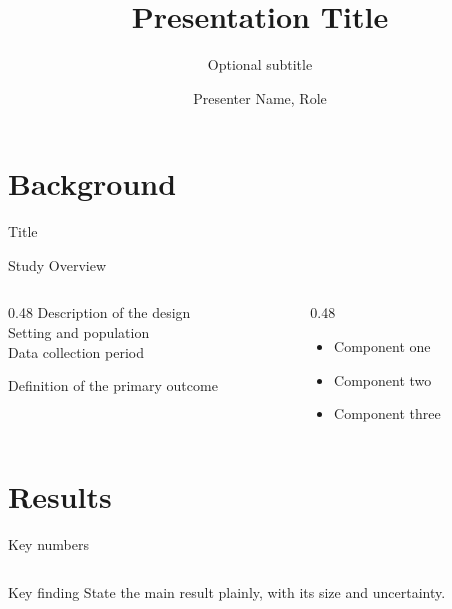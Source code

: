 \documentclass[aspectratio=169, 11pt]{beamer}
\title{Presentation Title}
\subtitle{Optional subtitle}
\author{Presenter Name, Role}
\institute{Neudata Consulting Ltd}
\date{\neudatatoday}   %
\begin{document}
\neudatatitleframe

\section{Background}

\begin{frame}{Title}
\end{frame}

\begin{frame}{Study Overview}
  \begin{columns}[T]
    \begin{column}{0.48\textwidth}
      Description of the design \\
      Setting and population \\
      Data collection period

      Definition of the primary outcome
    \end{column}
    \begin{column}{0.48\textwidth}
      \begin{itemize}
        \item Component one
        \item Component two
        \item Component three
      \end{itemize}
    \end{column}
  \end{columns}
\end{frame}

\section{Results}

\begin{frame}{Key numbers}
  \vspace{0.6cm}
  \begin{columns}[T]
  \end{columns}
  \vspace{0.9cm}
  \begin{block}{Key finding}
    State the main result plainly, with its size and uncertainty.
  \end{block}
\end{frame}
\end{document}

